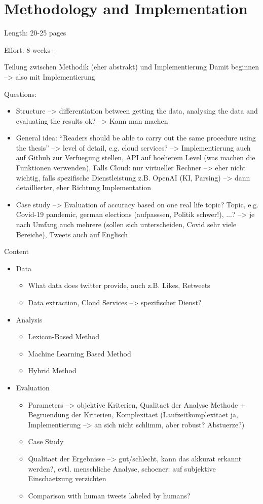 \chapter{Methodology and Implementation}
\label{cha:Chapter4_Methodology}

Length: 20-25 pages

Effort: 8 weeks+

Teilung zwischen Methodik (eher abstrakt) und Implementierung
Damit beginnen --> also mit Implementierung

Questions:
\begin{itemize}
\item Structure --> differentiation between getting the data, analysing the data and evaluating the results ok? --> Kann man machen
\item General idea: ``Readers should be able to carry out the same procedure using the thesis'' --> level of detail, e.g. cloud services? --> Implementierung auch auf Github zur Verfuegung stellen, API auf hoeherem Level (was machen die Funktionen verwenden),
Falls Cloud: nur virtueller Rechner --> eher nicht wichtig, falls spezifische Dienstleistung z.B. OpenAI (KI, Parsing) --> dann detaillierter, eher Richtung Implementation
\item Case study --> Evaluation of accuracy based on one real life topic? Topic, e.g. Covid-19 pandemic, german elections (aufpasssen, Politik schwer!), ...? --> je nach Umfang auch mehrere (sollen sich unterscheiden, Covid sehr viele Bereiche), Tweets auch auf Englisch
\end{itemize}

Content
\begin{itemize}
\item Data 
\begin{itemize}
    \item What data does twitter provide, auch z.B. Likes, Retweets
    \item Data extraction, Cloud Services --> spezifischer Dienst?
\end{itemize}
\item Analysis
\begin{itemize}
    \item Lexicon-Based Method
    \item Machine Learning Based Method
    \item Hybrid Method
\end{itemize}
\item Evaluation
\begin{itemize}
    \item Parameters --> objektive Kriterien, Qualitaet der Analyse Methode + Begruendung der Kriterien, Komplexitaet (Laufzeitkomplexitaet ja, Implementierung --> an sich nicht schlimm, aber robust? Abstuerze?)
    \item Case Study
    \item Qualitaet der Ergebnisse --> gut/schlecht, kann das akkurat erkannt werden?, evtl. menschliche Analyse, schoener: auf subjektive Einschaetzung verzichten
    \item Comparison with human tweets labeled by humans?
\end{itemize}
\end{itemize}


